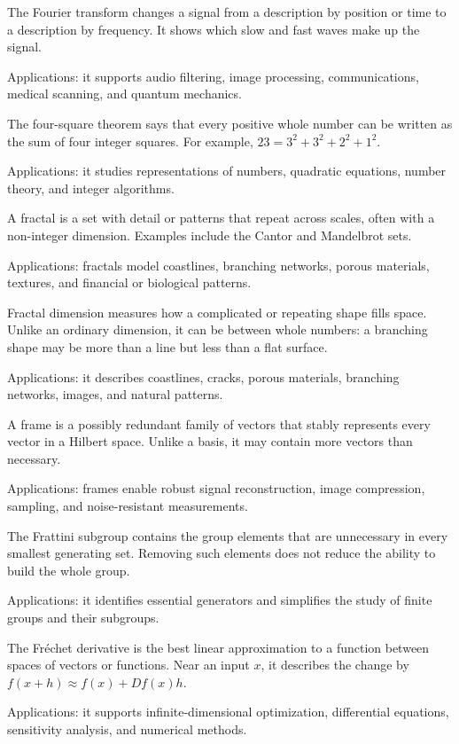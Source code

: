 The Fourier transform changes a signal from a description by position or time to a description by frequency. It shows which slow and fast waves make up the signal. \par\noindent Applications: it supports audio filtering, image processing, communications, medical scanning, and quantum mechanics.

The four-square theorem says that every positive whole number can be written as the sum of four integer squares. For example, $23=3^2+3^2+2^2+1^2$. \par\noindent Applications: it studies representations of numbers, quadratic equations, number theory, and integer algorithms.

A fractal is a set with detail or patterns that repeat across scales, often with a non-integer dimension. Examples include the Cantor and Mandelbrot sets. \par\noindent Applications: fractals model coastlines, branching networks, porous materials, textures, and financial or biological patterns.

Fractal dimension measures how a complicated or repeating shape fills space. Unlike an ordinary dimension, it can be between whole numbers: a branching shape may be more than a line but less than a flat surface. \par\noindent Applications: it describes coastlines, cracks, porous materials, branching networks, images, and natural patterns.

A frame is a possibly redundant family of vectors that stably represents every vector in a Hilbert space. Unlike a basis, it may contain more vectors than necessary. \par\noindent Applications: frames enable robust signal reconstruction, image compression, sampling, and noise-resistant measurements.

The Frattini subgroup contains the group elements that are unnecessary in every smallest generating set. Removing such elements does not reduce the ability to build the whole group. \par\noindent Applications: it identifies essential generators and simplifies the study of finite groups and their subgroups.

The Fréchet derivative is the best linear approximation to a function between spaces of vectors or functions. Near an input $x$, it describes the change by $f(x+h)\approx f(x)+Df(x)h$. \par\noindent Applications: it supports infinite-dimensional optimization, differential equations, sensitivity analysis, and numerical methods.

